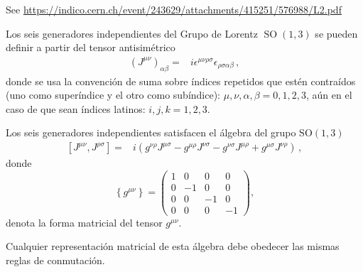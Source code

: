 See \url{https://indico.cern.ch/event/243629/attachments/415251/576988/L2.pdf}

\begin{frame}
  Los seis generadores independientes del Grupo de Lorentz $\operatorname{SO}(1,3)$ se pueden definir a partir del tensor antisimétrico
\begin{align}
   \left(J^{\mu\nu}\right)_{\alpha\beta}=&i\epsilon^{\mu\nu\rho\sigma}\epsilon_{\rho\sigma\alpha\beta}\,,
\end{align}
donde se usa la convención de suma sobre índices repetidos que estén contraídos (uno como superíndice y el otro como subíndice): $\mu,\nu,\alpha,\beta=0,1,2,3$, aún en el caso de que sean índices latinos: $i,j,k=1,2,3$. 


Los seis generadores independientes satisfacen el álgebra del grupo $\operatorname{SO(1,3)}$
\begin{align}
\label{eq:lrtalg}
  \left[{J}^{\mu\nu},{J}^{\rho\sigma}\right]=&
i(g^{\nu\rho}{J}^{\mu\sigma}-g^{\mu\rho}{J}^{\nu\sigma}-g^{\nu\sigma}{J}^{\mu\rho}+g^{\mu\sigma}{J}^{\nu\rho})\,,
\end{align}
donde 
\begin{equation}
  \left\{ g^{\mu\nu} \right\}=
  \begin{pmatrix}
    1&0&0&0\\
    0&-1&0&0\\
    0&0&-1&0\\
    0&0&0&-1
  \end{pmatrix},
\end{equation}
denota la forma matricial del tensor $g^{\mu\nu}$.  


Cualquier representación matricial de esta álgebra debe obedecer las mismas reglas de conmutación.


\end{frame}
